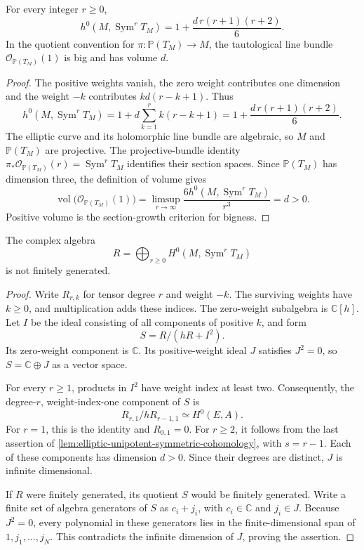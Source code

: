 \begin{theorem}\label{thm:split-elliptic-symmetric-dimensions}
For every integer $r\geq0$,
\[
 h^0(M,\operatorname{Sym}^rT_M)
       =1+\frac{d\,r(r+1)(r+2)}6.
\]
In the quotient convention for $\pi:\mathbb P(T_M)\to M$, the tautological line bundle $\mathcal O_{\mathbb P(T_M)}(1)$ is big and has volume $d$.
\end{theorem}
\begin{proof}
The positive weights vanish, the zero weight contributes one dimension and the weight $-k$ contributes $kd(r-k+1)$. Thus
\[
 h^0(M,\operatorname{Sym}^rT_M)
 =1+d\sum_{k=1}^r k(r-k+1)
 =1+\frac{d\,r(r+1)(r+2)}6.
\]
The elliptic curve and its holomorphic line bundle are algebraic, so $M$ and $\mathbb P(T_M)$ are projective. The projective-bundle identity $\pi_*\mathcal O_{\mathbb P(T_M)}(r)=\operatorname{Sym}^rT_M$ identifies their section spaces. Since $\mathbb P(T_M)$ has dimension three, the definition of volume gives
\[
 \operatorname{vol}\bigl(\mathcal O_{\mathbb P(T_M)}(1)\bigr)
 =\limsup_{r\to\infty}\frac{6h^0(M,\operatorname{Sym}^rT_M)}{r^3}=d>0.
\]
Positive volume is the section-growth criterion for bigness.
\end{proof}

\begin{theorem}\label{thm:split-elliptic-tangent-ring-nonfinite}
The complex algebra
\[
 R=\bigoplus_{r\geq0}H^0(M,\operatorname{Sym}^rT_M)
\]
is not finitely generated.
\end{theorem}
\begin{proof}
Write $R_{r,k}$ for tensor degree $r$ and weight $-k$. The surviving weights have $k\geq0$, and multiplication adds these indices. The zero-weight subalgebra is $\mathbb C[h]$. Let $I$ be the ideal consisting of all components of positive $k$, and form
\[
 S=R/(hR+I^2).
\]
Its zero-weight component is $\mathbb C$. Its positive-weight ideal $J$ satisfies $J^2=0$, so $S=\mathbb C\oplus J$ as a vector space.

For every $r\geq1$, products in $I^2$ have weight index at least two. Consequently, the degree-$r$, weight-index-one component of $S$ is
\[
 R_{r,1}/hR_{r-1,1}\simeq H^0(E,A).
\]
For $r=1$, this is the identity and $R_{0,1}=0$. For $r\geq2$, it follows from the last assertion of \cref{lem:elliptic-unipotent-symmetric-cohomology}, with $s=r-1$. Each of these components has dimension $d>0$. Since their degrees are distinct, $J$ is infinite dimensional.

If $R$ were finitely generated, its quotient $S$ would be finitely generated. Write a finite set of algebra generators of $S$ as $c_i+j_i$, with $c_i\in\mathbb C$ and $j_i\in J$. Because $J^2=0$, every polynomial in these generators lies in the finite-dimensional span of $1,j_1,\ldots,j_N$. This contradicts the infinite dimension of $J$, proving the assertion.
\end{proof}
